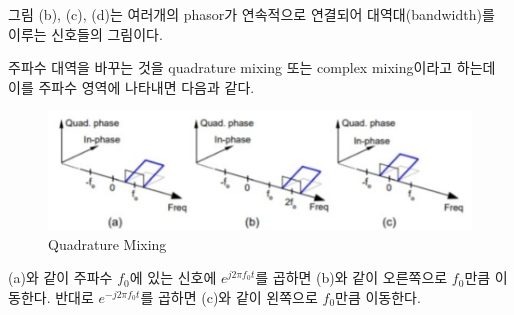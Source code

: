     그림 (b), (c), (d)는 여러개의 phasor가 연속적으로 연결되어 대역대(bandwidth)를 이루는 신호들의 그림이다.

    주파수 대역을 바꾸는 것을 quadrature mixing 또는 complex mixing이라고 하는데 이를 주파수 영역에 나타내면 다음과 같다.
    
    \vspace{-4mm}  
    \begin{figure}[!h]\centering
		\includegraphics[width=.75\textwidth]{image/week02/2-2-4.png}
		\caption{\small Quadrature Mixing}
		\vspace{-10pt}
    \end{figure}
    
    (a)와 같이 주파수 $f_0$에 있는 신호에 $e^{j2\pi f_0 t}$를 곱하면 (b)와 같이 오른쪽으로 $f_0$만큼 이동한다. 반대로 $e^{-j2\pi f_0 t}$를 곱하면 (c)와 같이 왼쪽으로 $f_0$만큼 이동한다.